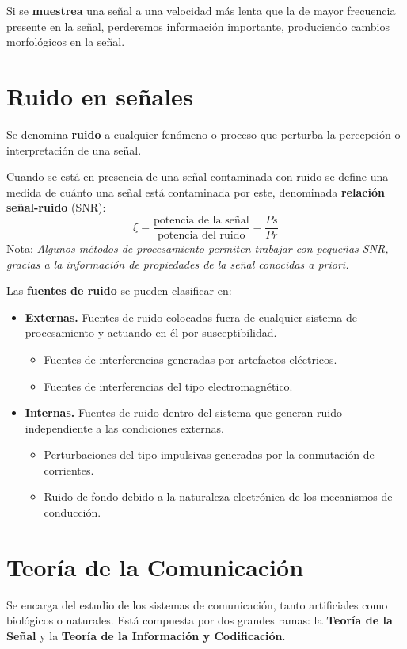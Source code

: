 \documentclass[10pt,a4paper]{book}
\begin{document}
Si se \textbf{muestrea} una señal a una velocidad más lenta que la de mayor frecuencia presente en la señal, perderemos información importante, produciendo cambios morfológicos en la señal.

\section{Ruido en señales}
Se denomina \textbf{ruido} a cualquier fenómeno o proceso que perturba la percepción o interpretación de una señal.

Cuando se está en presencia de una señal contaminada con ruido se define una medida de cuánto una señal está contaminada por este, denominada \textbf{relación señal-ruido} (SNR):
\[\xi=\frac{\text{potencia de la señal}}{\text{potencia del ruido}}=\frac{Ps}{Pr}\]
Nota: \textit{Algunos métodos de procesamiento permiten trabajar con pequeñas SNR, gracias a la información de propiedades de la señal conocidas a priori.}

Las \textbf{fuentes de ruido} se pueden clasificar en:
\begin{itemize}
\item \textbf{Externas.} Fuentes de ruido colocadas fuera de cualquier sistema de procesamiento y actuando en él por susceptibilidad.
\begin{itemize}
\item Fuentes de interferencias generadas por artefactos eléctricos.
\item Fuentes de interferencias del tipo electromagnético.
\end{itemize}
\item \textbf{Internas.} Fuentes de ruido dentro del sistema que generan ruido independiente a las condiciones externas.
\begin{itemize}
\item Perturbaciones del tipo impulsivas generadas por la conmutación de corrientes.
\item Ruido de fondo debido a la naturaleza electrónica de los mecanismos de conducción.
\end{itemize}
\end{itemize}

\section{Teoría de la Comunicación}
Se encarga del estudio de los sistemas de comunicación, tanto artificiales como biológicos o naturales. Está compuesta por dos grandes ramas: la \textbf{Teoría de la Señal} y la \textbf{Teoría de la Información y Codificación}.
\end{document}
